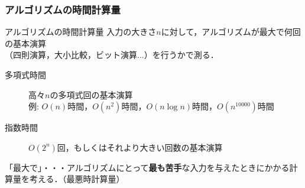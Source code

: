 \documentclass[14pt,aspectratio=169,xcolor=dvipsnames,table,onlytextwidth,dvipdfmx]{beamer}
\begin{document}
\begin{frame}
    \frametitle{アルゴリズムの時間計算量}

    \begin{block}{アルゴリズムの時間計算量}
    入力の大きさ$n$に対して，アルゴリズムが\alert{最大で}何回の\alert{基本演算}\\ 
    （四則演算，大小比較，ビット演算...）を行うかで測る．
    \end{block}
    \pause
    \vfill
    \begin{description}
        \item[多項式時間] 高々$n$の多項式回の基本演算 \\
        \textcolor{UniGreen}{例:} $O(n)$時間，$O(n^2)$時間，$O(n \log n)$時間，$O(n^{10000})$時間
        \item[指数時間] $O(2^n)$回，もしくはそれより大きい回数の基本演算
    \end{description}
    \pause
    \vfill
    \alert{「最大で」}・・・アルゴリズムにとって\textbf{最も苦手}な入力を与えたときにかかる計算量を考える．（最悪時計算量）
\end{frame}

\end{document}
